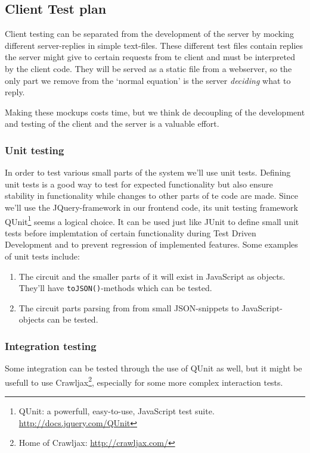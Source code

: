 \subsection{Client Test plan}
Client testing can be separated from the development of the server by mocking different server-replies in simple text-files. These different test files contain replies the server might give to certain requests from te client and must be interpreted by the client code. They will be served as a static file from a webserver, so the only part we remove from the `normal equation' is the server \textit{deciding} what to reply.

Making these mockups costs time, but we think de decoupling of the development and testing of the client and the server is a valuable effort.

\subsubsection{Unit testing}
In order to test various small parts of the system we'll use unit tests. Defining unit tests is a good way to test for expected functionality but also ensure stability in functionality while changes to other parts of te code are made. Since we'll use the JQuery-framework in our frontend code, its unit testing framework QUnit\footnote{QUnit: a powerfull, easy-to-use, JavaScript test suite. \url{http://docs.jquery.com/QUnit}} seems a logical choice. It can be used just like JUnit to define small unit tests before implemtation of certain functionality during Test Driven Development and to prevent regression of implemented features. Some examples of unit tests include:
\begin{enumerate}
	\item The circuit and the smaller parts of it will exist in JavaScript as objects. They'll have \verb|toJSON()|-methods which can be tested.
	\item The circuit parts parsing from from small JSON-snippets to JavaScript-objects can be tested.
\end{enumerate}

\subsubsection{Integration testing}
Some integration can be tested through the use of QUnit as well, but it might be usefull to use Crawljax\footnote{Home of Crawljax: \url{http://crawljax.com/}}, especially for some more complex interaction tests.

